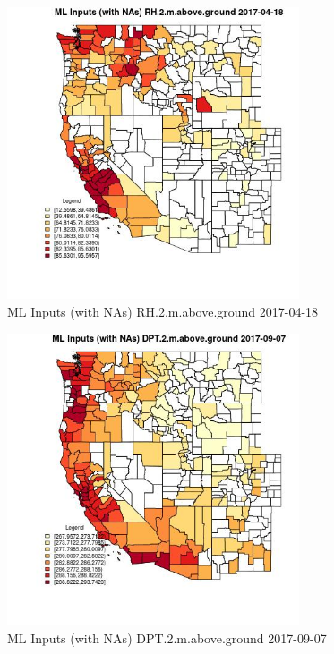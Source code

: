 \begin{figure} 
\centering  
\includegraphics[width=0.77\textwidth]{Code_Outputs/Report_ML_input_PM25_Step4_part_e_de_duplicated_aves_compiled_2019-05-20wNAs_CountyRH2mabovegroundMean2017-04-18.jpg} 
\caption{\label{fig:Report_ML_input_PM25_Step4_part_e_de_duplicated_aves_compiled_2019-05-20wNAsCountyRH2mabovegroundMean2017-04-18}ML Inputs (with NAs) RH.2.m.above.ground 2017-04-18} 
\end{figure} 
 

\begin{figure} 
\centering  
\includegraphics[width=0.77\textwidth]{Code_Outputs/Report_ML_input_PM25_Step4_part_e_de_duplicated_aves_compiled_2019-05-20wNAs_CountyDPT2mabovegroundMean2017-09-07.jpg} 
\caption{\label{fig:Report_ML_input_PM25_Step4_part_e_de_duplicated_aves_compiled_2019-05-20wNAsCountyDPT2mabovegroundMean2017-09-07}ML Inputs (with NAs) DPT.2.m.above.ground 2017-09-07} 
\end{figure} 
 

